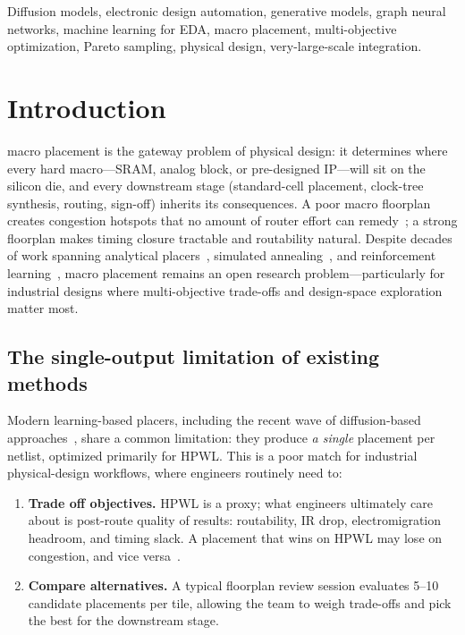 \documentclass{ieeeaccess}
\begin{document}
\begin{keywords}
Diffusion models, electronic design automation, generative models, graph neural networks, machine learning for EDA, macro placement, multi-objective optimization, Pareto sampling, physical design, very-large-scale integration.
\end{keywords}

\titlepgskip=-15pt

\maketitle

\section{Introduction}
\label{sec:introduction}
 macro placement is the gateway problem of physical design: it determines where every hard macro---SRAM, analog block, or pre-designed IP---will sit on the silicon die, and every downstream stage (standard-cell placement, clock-tree synthesis, routing, sign-off) inherits its consequences. A poor macro floorplan creates congestion hotspots that no amount of router effort can remedy~\cite{kahng2023ml}; a strong floorplan makes timing closure tractable and routability natural. Despite decades of work spanning analytical placers~\cite{lin2019dreamplace, autodmp}, simulated annealing~\cite{hierrtlmp, tritonmacroplace}, and reinforcement learning~\cite{mirhoseini2021nature}, macro placement remains an open research problem---particularly for industrial designs where multi-objective trade-offs and design-space exploration matter most.

\subsection{The single-output limitation of existing methods}

Modern learning-based placers, including the recent wave of diffusion-based approaches~\cite{lee2024chipdiffusion, fang2025graphdiffusion, trung2025diffplace, yoon2025geometric}, share a common limitation: they produce \emph{a single} placement per netlist, optimized primarily for HPWL. This is a poor match for industrial physical-design workflows, where engineers routinely need to:

\begin{enumerate}
\item \textbf{Trade off objectives.} HPWL is a proxy; what engineers ultimately care about is post-route quality of results: routability, IR drop, electromigration headroom, and timing slack. A placement that wins on HPWL may lose on congestion, and vice versa~\cite{cheng2024rethinking}.
\item \textbf{Compare alternatives.} A typical floorplan review session evaluates 5--10 candidate placements per tile, allowing the team to weigh trade-offs and pick the best for the downstream stage.
\end{enumerate}
\end{document}

